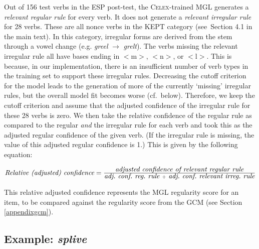 \documentclass[12pt]{article}
\begin{document}
Out of 156 test verbs in the ESP post-test, the \textsc{Celex}-trained MGL generates a {\em relevant regular rule} for every verb. It does not generate a {\em relevant irregular rule} for 28 verbs. These are all nonce verbs in the \textsc{KEPT} category (see\ Section 4.1 in the main text). In this category, irregular forms are derived from the stem through a vowel change (e.g. {\em greel} $\rightarrow{}$ {\em grelt}). The verbs missing the relevant irregular rule all have bases ending in $<$m$>$, $<$n$>$, or $<$l$>$. This is because, in our implementation, there is an insufficient number of verb types in the training set to support these irregular rules. Decreasing the cutoff criterion for the model leads to the generation of more of the currently `missing' irregular rules, but the overall model fit becomes worse (cf.\ below). Therefore, we keep the cutoff criterion and assume that the adjusted confidence of the irregular rule for these 28 verbs is zero. We then take the relative confidence of the regular rule as compared to the regular {\em and} the irregular rule for each verb and took this as the adjusted regular confidence of the given verb. (If the irregular rule is missing, the value of this adjusted regular confidence is 1.) This is given by the following equation:

\vspace{1cm}
$\mbox{\it Relative (adjusted) confidence} = \frac{\mbox{\it  adjusted confidence of relevant regular rule}} {\mbox{\it  adj.\ conf.\ reg.\ rule } + \mbox{ \it adj.\ conf.\ relevant irreg.\ rule}}$
\vspace{1cm}

This relative adjusted confidence represents the MGL regularity score for an item, to be compared against the regularity score from the GCM (see Section \ref{appendixgcm}).  

\subsection{Example: {\em splive}}
\end{document}
